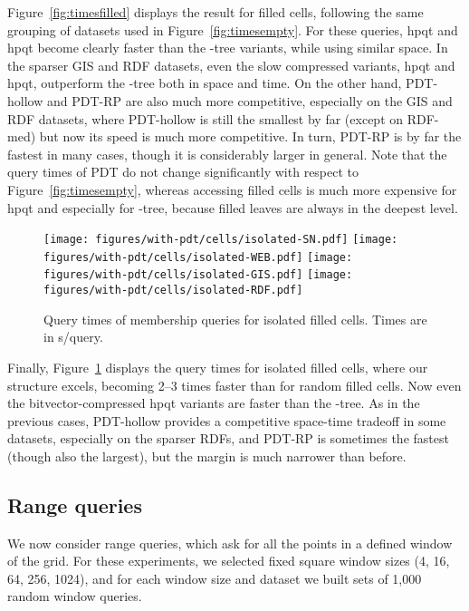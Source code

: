 \documentclass{elsarticle}
\newcommand{\kt}{-tree\xspace}
\newcommand{\rdfm}{\textsf{RDF-med}\xspace}
\newcommand{\hpqt}{\textsf{hpqt}\xspace}
\newcommand{\hpqtp}{\textsf{hpqt}\xspace}
\newcommand{\hpqtR}{\textsf{hpqt}\xspace}
\newcommand{\hpqtpdac}{\textsf{hpqt}\xspace}
\newcommand{\hpqtRdac}{\textsf{hpqt}\xspace}
\newcommand{\pdt}{PDT\xspace}
\newcommand{\pdth}{PDT-hollow\xspace}
\newcommand{\pdtrp}{PDT-RP\xspace}
\begin{document}
Figure~\ref{fig:timesfilled} displays the result for filled cells, following the same grouping of datasets used in Figure~\ref{fig:timesempty}. For these queries, \hpqtp and \hpqtpdac become clearly faster than the \kt variants, while using similar space. In the sparser GIS and RDF datasets, even the slow compressed variants, \hpqtR and \hpqtRdac, outperform the \kt both in space and time. On the other hand, \pdth and \pdtrp are also much more competitive, especially on the GIS and RDF datasets, where \pdth is still the smallest by far (except on \rdfm) but now its speed is much more competitive. In turn, \pdtrp is by far the fastest in many cases, though it is considerably larger in general. Note that the query times of \pdt do not change significantly with respect to Figure~\ref{fig:timesempty}, whereas accessing filled cells is much more expensive for \hpqt and especially for \kt, because filled leaves are always in the deepest level. 

\begin{figure}[t]
\begin{center}
\texttt{[image: figures/with-pdt/cells/isolated-SN.pdf]}
\texttt{[image: figures/with-pdt/cells/isolated-WEB.pdf]}
\texttt{[image: figures/with-pdt/cells/isolated-GIS.pdf]}
\texttt{[image: figures/with-pdt/cells/isolated-RDF.pdf]}
\end{center}
\caption{Query times of membership queries for isolated filled cells. Times are in s/query.}
\label{fig:timesisolated}
\end{figure}

Finally, Figure~\ref{fig:timesisolated} displays the query times for isolated filled cells, where our structure excels, becoming 2--3 times faster than for random filled cells. Now even the bitvector-compressed \hpqt variants are faster than the \kt. As in the previous cases, \pdth provides a competitive space-time tradeoff in some datasets, especially on the sparser RDFs, and \pdtrp is sometimes the fastest (though also the largest), but the margin is much narrower than before. 

\subsection{Range queries}

We now consider range queries, which ask for all the points in a defined window of the grid. 
For these experiments, we selected fixed square window sizes (4, 16, 64, 256, 1024), and for each window size and dataset we built sets of 1,000 random window queries.
\end{document}

